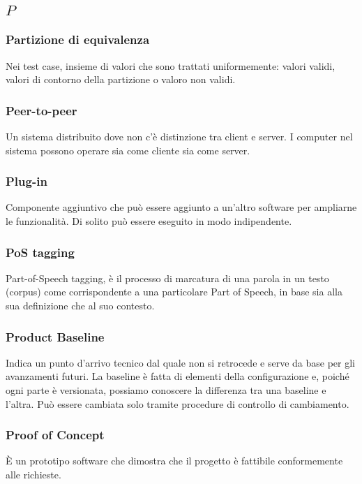 \subsection*{\quad$P\quad$}
\subsubsection*{Partizione di equivalenza}
Nei test case, insieme di valori che sono trattati uniformemente: valori validi, valori di contorno della partizione o valoro non validi.

\subsubsection*{Peer-to-peer}
Un sistema distribuito dove non c'è distinzione tra client e server. I computer nel sistema possono operare sia come cliente sia come server. 

\subsubsection*{Plug-in}
Componente aggiuntivo che può essere aggiunto a un'altro software per ampliarne le funzionalità. Di solito può essere eseguito in modo indipendente.

\subsubsection*{PoS tagging}
Part-of-Speech tagging, è il processo di marcatura di una parola in un testo (corpus) come corrispondente a una particolare Part of Speech\glosp , in base sia alla sua definizione che al suo contesto.

\subsubsection*{Product Baseline}
Indica un punto d’arrivo tecnico dal quale non si retrocede e serve da base per gli avanzamenti futuri. La baseline è fatta di elementi della configurazione e, poiché ogni parte è versionata, possiamo conoscere la differenza tra una baseline e l’altra. Può essere cambiata solo tramite procedure di controllo di cambiamento.

\subsubsection*{Proof of Concept}
È un prototipo software che dimostra che il progetto è fattibile conformemente alle richieste.

